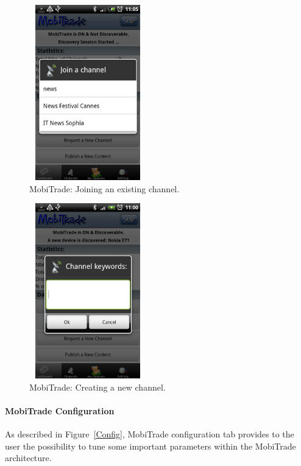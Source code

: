 \begin{figure}[!h]
\begin{center}
\includegraphics[width=2in,height=3in]{Chapitre6/JoinExistingChannel.png}
\end{center}
\caption{MobiTrade: Joining an existing channel.}
\label{JoiningExistingChannel}
\end{figure}

\begin{figure}[!h]
\begin{center}
\includegraphics[width=2in,height=3in]{Chapitre6/CreateChannel.png}
\end{center}
\caption{MobiTrade: Creating a new channel.}
\label{CreatingNewChannel}
\end{figure}

\paragraph{MobiTrade Configuration}

As described in Figure~\ref{Config}, MobiTrade configuration tab provides to the user the possibility to tune some important parameters within the MobiTrade architecture. 

